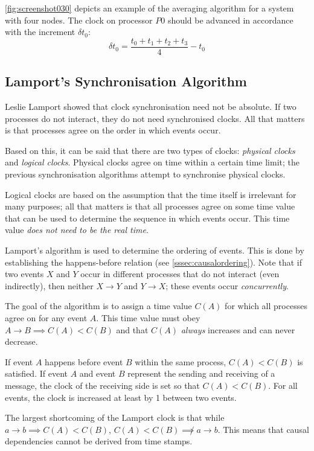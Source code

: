 \autoref{fig:screenshot030} depicts an example of the averaging algorithm for a system with four nodes. The clock on processor $P0$ should be advanced in accordance with the increment $\delta t_0$:
\[ \delta t_0 = \frac{t_0 + t_1 + t_2 + t_3}{4} - t_0 \]

\subsection{Lamport's Synchronisation Algorithm}
Leslie Lamport showed that clock synchronisation need not be absolute. If two processes do not interact, they do not need synchronised clocks. All that matters is that processes agree on the order in which events occur.

Based on this, it can be said that there are two types of clocks: \textit{physical clocks} and \textit{logical clocks}. Physical clocks agree on time within a certain time limit; the previous synchronisation algorithms attempt to synchronise physical clocks.

Logical clocks are based on the assumption that the time itself is irrelevant for many purposes; all that matters is that all processes agree on some time value that can be used to determine the sequence in which events occur. This time value \textit{does not need to be the real time}.

Lamport's algorithm is used to determine the ordering of events. This is done by establishing the happens-before relation (see \autoref{sssec:causalordering}). Note that if two events $X$ and $Y$ occur in different processes that do not interact (even indirectly), then neither $X \rightarrow Y$ and $Y \rightarrow X$; these events occur \textit{concurrently}.

The goal of the algorithm is to assign a time value $C(A)$ for which all processes agree on for any event $A$. This time value must obey $A \rightarrow B \implies C(A) < C(B)$ and that $C(A)$ \textit{always} increases and can never decrease.

If event $A$ happens before event $B$ within the same process, $C(A) < C(B)$ is satisfied. If event $A$ and event $B$ represent the sending and receiving of a message, the clock of the receiving side is set so that $C(A) < C(B)$. For all events, the clock is increased at least by 1 between two events.

The largest shortcoming of the Lamport clock is that while $a \rightarrow b \implies C(A) < C(B)$, $C(A) < C(B) \not\implies a \rightarrow b$. This means that causal dependencies cannot be derived from time stamps.

